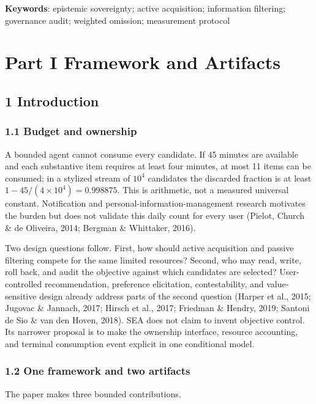 \documentclass[
  11pt]{article}
\begin{document}
\textbf{Keywords}: epistemic sovereignty; active acquisition;
information filtering; governance audit; weighted omission; measurement
protocol

\section{Part I Framework and
Artifacts}\label{part-i-framework-and-artifacts}

\subsection{1 Introduction}\label{introduction}

\subsubsection{1.1 Budget and ownership}\label{budget-and-ownership}

A bounded agent cannot consume every candidate. If 45 minutes are
available and each substantive item requires at least four minutes, at
most 11 items can be consumed; in a stylized stream of \(10^4\)
candidates the discarded fraction is at least
\(1-45/(4\times10^4)=0.998875\). This is arithmetic, not a measured
universal constant. Notification and personal-information-management
research motivates the burden but does not validate this daily count for
every user (Pielot, Church \& de Oliveira, 2014; Bergman \& Whittaker,
2016).

Two design questions follow. First, how should active acquisition and
passive filtering compete for the same limited resources? Second, who
may read, write, roll back, and audit the objective against which
candidates are selected? User-controlled recommendation, preference
elicitation, contestability, and value-sensitive design already address
parts of the second question (Harper et al., 2015; Jugovac \& Jannach,
2017; Hirsch et al., 2017; Friedman \& Hendry, 2019; Santoni de Sio \&
van den Hoven, 2018). SEA does not claim to invent objective control.
Its narrower proposal is to make the ownership interface, resource
accounting, and terminal consumption event explicit in one conditional
model.

\subsubsection{1.2 One framework and two
artifacts}\label{one-framework-and-two-artifacts}

The paper makes three bounded contributions.
\end{document}
